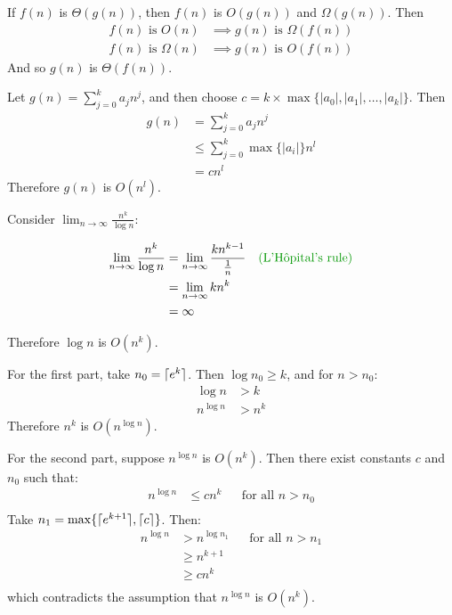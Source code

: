 \documentclass[12pt]{extarticle}
\begin{document}
If $f(n)$ is $\Theta(g(n))$, then $f(n)$ is $O(g(n))$ and $\Omega(g(n))$.
Then
\begin{align*}
f(n) \text{ is } O(n) & \implies g(n) \text{ is } \Omega(f(n)) \\
f(n) \text{ is } \Omega(n) & \implies g(n) \text{ is } O(f(n))
\end{align*}
And so $g(n)$ is $\Theta(f(n))$.


Let $g(n) = \sum_{j=0}^k a_j n^j$, and then choose $c=k\times \max\{|a_0|, |a_1|, \ldots, |a_k|\}$.
Then
\begin{align*}
g(n) & = \sum_{j=0}^k a_j n^j \\
& \le \sum_{j=0}^k \max\{|a_i|\} n^l \\
& = cn^l
\end{align*}
Therefore $g(n)$ is $O(n^l)$.



Consider $\lim_{n\to\infty} \frac{n^k}{\log n}$:

\begin{align*}
\lim_{n\to\infty} \frac{n^k}{\log n} & = \lim_{n\to\infty} \frac{k n^{k-1}}{\frac{1}{n}} && \expl{L'H\^opital's rule}\\
& = \lim_{n\to\infty} k n^k \\
& = \infty
\end{align*}

Therefore $\log n$ is $O(n^k)$.


For the first part, take $n_0=\lceil e^k\rceil$. Then $\log{n_0}\ge k$, and for $n>n_0$:
\begin{align*}
\log{n} & > k \\
n^{\log{n}} & > n^k
\end{align*}
Therefore $n^k$ is $O(n^{\log n})$.

For the second part, suppose $n^{\log n}$ is $O(n^k)$.
Then there exist constants $c$ and $n_0$ such that:
\begin{align*}
n^{\log n} & \le c n^k && \text{for all } n > n_0 \\
\end{align*}
Take $n_1 = \max\{\lceil e^{k+1}\rceil,\lceil c\rceil\}$. Then:
\begin{align*}
n^{\log{n}} & > n^{\log{n_1}} && \text{for all } n > n_1 \\
& \ge n^{k+1} \\
& \ge c n^k \\
\end{align*}
which contradicts the assumption that $n^{\log n}$ is $O(n^k)$.
\end{document}
